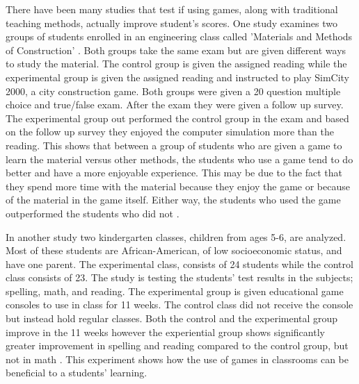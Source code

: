There have been many studies that test if using games, along with traditional teaching methods, actually improve student's scores. One study examines two groups of students enrolled in an engineering class called 'Materials and Methods of Construction' \cite{Tobias2014}. Both groups take the same exam but are given different ways to study the material. The control group is given the assigned reading while the experimental group is given the assigned reading and instructed to play SimCity 2000, a city construction game. Both groups were given a 20 question multiple choice and true/false exam. After the exam they were given a follow up survey. The experimental group out performed the control group in the exam and based on the follow up survey they enjoyed the computer simulation more than the reading. This shows that between a group of students who are given a game to learn the material versus other methods, the students who use a game tend to do better and have a more enjoyable experience. This may be due to the fact that they spend more time with the material because they enjoy the game or because of the material in the game itself. Either way, the students who used the game outperformed the students who did not \cite{Tobias2014}. 


In another study two kindergarten classes, children from ages 5-6, are analyzed. Most of these students are African-American, of low socioeconomic status, and have one parent. The experimental class, consists of 24 students while the control class consists of 23. The study is testing the students' test results in the subjects; spelling, math, and reading. The experimental group is given educational game consoles to use in class for 11 weeks. The control class did not receive the console but instead hold regular classes. Both the control and the experimental group improve in the 11 weeks however the experiential group shows significantly greater improvement in spelling and reading compared to the control group, but not in math \cite{Tobias2014}. This experiment shows how the use of games in classrooms can be beneficial to a students' learning. 

